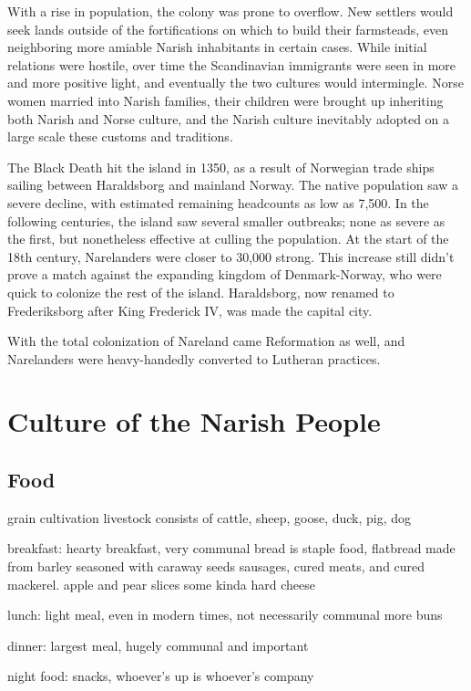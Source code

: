 \documentclass[a4paper,11pt,twoside,openright]{memoir}
\begin{document}
With a rise in population, the colony was prone to overflow. New settlers would seek lands outside of the fortifications on which to build their farmsteads, even neighboring more amiable Narish inhabitants in certain cases. While initial relations were hostile, over time the Scandinavian immigrants were seen in more and more positive light, and eventually the two cultures would intermingle. Norse women married into Narish families, their children were brought up inheriting both Narish and Norse culture, and the Narish culture inevitably adopted on a large scale these customs and traditions.

The Black Death hit the island in 1350, as a result of Norwegian trade ships sailing between Haraldsborg and mainland Norway. The native population saw a severe decline, with estimated remaining headcounts as low as 7,500. In the following centuries, the island saw several smaller outbreaks; none as severe as the first, but nonetheless effective at culling the population. At the start of the 18th century, Narelanders were closer to 30,000 strong.
This increase still didn't prove a match against the expanding kingdom of Denmark-Norway, who were quick to colonize the rest of the island. Haraldsborg, now renamed to Frederiksborg after King Frederick IV, was made the capital city.

With the total colonization of Nareland came Reformation as well, and Narelanders were heavy-handedly converted to Lutheran practices. 

\part{Culture of the Narish People}

\chapter{Food}

grain cultivation
livestock consists of cattle, sheep, goose, duck, pig, dog

breakfast:
hearty breakfast, very communal
bread is staple food, flatbread made from barley seasoned with caraway seeds
sausages, cured meats, and cured mackerel. 
apple and pear slices
some kinda hard cheese

lunch:
light meal, even in modern times, not necessarily communal
more buns

dinner:
largest meal, hugely communal and important

night food:
snacks, whoever's up is whoever's company
\end{document}
